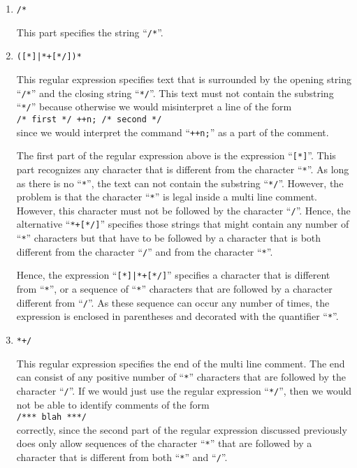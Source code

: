 \begin{enumerate}
\item \texttt{/*} 

      This part specifies the string ``\texttt{/*}''.
\item \texttt{([*]|*+[*/])*}
  
      This regular expression specifies text that is surrounded by the opening string
      ``\texttt{/*}'' and the closing string  ``\texttt{*/}''.  This text must not contain the
      substring ``\texttt{*/}'' because otherwise we would misinterpret a line of the form
      \\[0.2cm]
      \hspace*{1.3cm} \texttt{/* first */ ++n; /* second */}
      \\[0.2cm]
      since we would interpret the command ``\texttt{++n;}'' as a part of the comment.
      
      The first part of the regular expression above is the expression ``\texttt{[*]}''.
      This part recognizes any character that is different from the character ``\texttt{*}''.  As
      long as there is no  ``\texttt{*}'', the text can not contain the substring ``\texttt{*/}''.
      However, the problem is that the character ``\texttt{*}'' is legal inside a
      multi line comment.  However, this character must not be followed by the character ``\texttt{/}''.
      Hence, the alternative ``\texttt{*+[*/]}'' specifies those strings
      that might contain any number of ``\texttt{*}'' characters but that have to be followed by a character
      that is both different from the character ``\texttt{/}'' and from the character ``\texttt{*}''.
      
      Hence, the expression  ``\texttt{[*]|*+[*/]}''
      specifies a character that is different from  ``\texttt{*}'', or a sequence of ``\texttt{*}''
      characters that are followed by a character different from ``\texttt{/}''.  As these sequence
      can occur any number of times, the expression is enclosed in parentheses and decorated with
      the quantifier ``\texttt{*}''.   
\item \texttt{*+/}
  
      This regular expression specifies the end of the multi line comment.
      The end can consist of any positive number of  ``\texttt{*}'' characters that are followed by
      the character  ``\texttt{/}''.  If we would just use the regular expression
      ``\texttt{*/}'', then we would not be able to identify comments of the form
      \\[0.2cm]
      \hspace*{1.3cm}
      \texttt{/*** blah ***/}
      \\[0.2cm]
      correctly, since the second part of the regular expression discussed previously does only allow sequences
      of the character ``\texttt{*}'' that are followed by a character that is different from both
      ``\texttt{*}'' and ``\texttt{/}''.
\end{enumerate}

